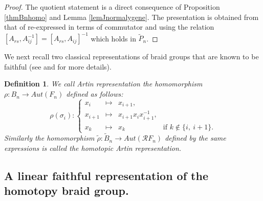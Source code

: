 \documentclass[11pt, a4paper, twoside,reqno]{amsart}
\newtheorem{defn}[thm]{Definition}
\begin{document}
\begin{proof}
The quotient statement is a direct consequence of Proposition \ref{thmBnhomo} and Lemma \ref{lemJnormalygene}. The presentation is obtained from that of \cite[Theorem 3.8]{MurasugiKunioKurpitaStudyofbraid} re-expressed in terms of commutator and using the relation $[A_{rs},A_{ij}^{-1}]=[A_{rs},A_{ij}]^{-1}$ which holds in $\tilde P_n$.
\end{proof}

We next recall two classical representations of braid groups that are known to be faithful (see \cite{ArtinBraid} and \cite{HabeggerLinHomotopy} for more details).
\begin{defn}
We call \emph{Artin representation} the homomorphism $\rho :B_n\rightarrow Aut(F_n)$ defined as follows:\[ \rho(\sigma_i): \left \{ \begin{array}{llll}
    x_i&\mapsto&x_{i+1},&\\
    x_{i+1} &\mapsto&x_{i+1}x_ix_{i+1}^{-1},&\\
    x_k&\mapsto&x_k&\mbox{if }k\notin\{i,\ i+1\}.
 \end{array}
 \right.\]
Similarly the homomorphism $\tilde \rho :\tilde{B}_n\rightarrow Aut(\mathcal RF_n)$ defined by the same expressions is called the \emph{homotopic Artin representation}.
 \end{defn}
\subsection{A linear faithful representation of the homotopy braid group.}\label{sectionrpz}
\end{document}

